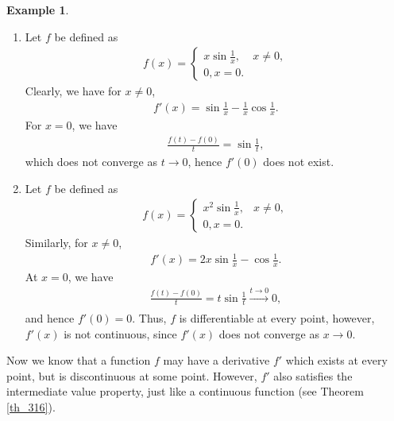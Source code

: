 \documentclass[11pt]{book}
\theoremstyle{definition}
\newtheorem{example}{Example}[chapter]
\numberwithin{equation}{chapter}
\begin{document}
\medskip

\begin{example}
~\begin{enumerate}[label=(\alph*)]
    \item Let $f$ be defined as
    \begin{align*}
        f(x) = \begin{cases}
            x \sin \frac{1}{x}, & x \neq 0, \\
            0, x = 0.
        \end{cases}
    \end{align*}
    Clearly, we have for $x \neq 0$,
    \begin{align*}
        f'(x) = \sin \frac{1}{x} - \frac{1}{x} \cos \frac{1}{x}.
    \end{align*}
    For $x = 0$, we have
    \begin{align*}
        \frac{f(t) - f(0)}{t} = \sin \frac{1}{t},
    \end{align*}
    which does not converge as $t \to 0$, hence $f'(0)$ does not exist.
    
    \item Let $f$ be defined as
    \begin{align*}
        f(x) = \begin{cases}
            x^2 \sin \frac{1}{x}, & x \neq 0, \\
            0, x = 0.
        \end{cases}
    \end{align*}
    Similarly, for $x \neq 0$,
    \begin{align*}
        f'(x) = 2x \sin \frac{1}{x} - \cos \frac{1}{x}.
    \end{align*}
    At $x = 0$, we have
    \begin{align*}
        \frac{f(t) - f(0)}{t} = t \sin \frac{1}{t} \xrightarrow[]{t \to 0} 0, 
    \end{align*}
    and hence $f'(0) = 0$. Thus, $f$ is differentiable at every point, however, $f'(x)$ is not continuous, since $f'(x)$ does not converge as $x \to 0$.
\end{enumerate}
\end{example}

\medskip

Now we know that a function $f$ may have a derivative $f'$ which exists at every point, but is discontinuous at some point. However, $f'$ also satisfies the intermediate value property, just like a continuous function (see Theorem \ref{th_316}).
\end{document}
